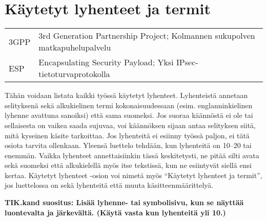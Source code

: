 


\section*{Käytetyt lyhenteet ja termit}

\begin{center}
\begin{tabular}{p{}p{}}
3GPP  & 3rd Generation Partnership Project; Kolmannen sukupolven  matkapuhelupalvelu \\ 
ESP & Encapsulating Security Payload; Yksi IPsec-tietoturvaprotokolla \\ 
\end{tabular}
\end{center}

\vspace{10mm}

Tähän voidaan listata kaikki työssä käytetyt lyhenteet. Lyhenteistä
annetaan selityksenä sekä alkukielinen termi kokonaisuudessaan
(esim. englanninkielinen lyhenne avattuna sanoiksi) että sama
suomeksi. Jos suoraa käännöstä ei ole tai sellaisesta on vaikea saada
sujuvaa, voi käännöksen sijaan antaa selityksen siitä, mitä kyseinen
käsite tarkoittaa. Jos lyhenteitä ei esiinny työssä paljon, ei tätä
osiota tarvita ollenkaan. Yleensä luettelo tehdään, kun lyhenteitä on
10--20 tai enemmän. Vaikka lyhenteet annettaisiinkin tässä
keskitetysti, ne pitää silti avata sekä suomeksi että alkukielellä
myös itse tekstissä, kun ne esiintyvät siellä ensi kertaa.  Käytetyt
lyhenteet -osion voi nimetä myös ``Käytetyt lyhenteet ja termit'', jos
luettelossa on sekä lyhenteitä että muuta käsitteenmäärittelyä.

\textbf{TIK.kand suositus: Lisää lyhenne- tai symbolisivu, kun se
  näyttää luontevalta ja järkevältä. (Käytä vasta kun lyhenteitä yli 10.)}


